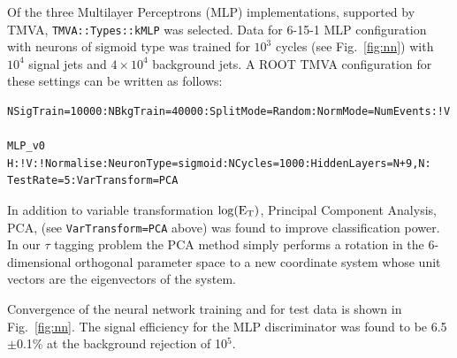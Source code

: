 \documentclass[a4paper]{jpconf}
\begin{document}




Of the three Multilayer Perceptrons (MLP) implementations, 
supported by TMVA,
{\tt TMVA::Types::kMLP} was selected.
Data for 6-15-1 MLP configuration with neurons of sigmoid type 
was trained for $10^3$ cycles (see Fig.~\ref{fig:nn}) with
$10^4$ signal jets and $4\times 10^4$ background jets. 
A ROOT TMVA configuration for these settings can be written as follows:
 
\begin{verbatim}
NSigTrain=10000:NBkgTrain=40000:SplitMode=Random:NormMode=NumEvents:!V

MLP_v0  H:!V:!Normalise:NeuronType=sigmoid:NCycles=1000:HiddenLayers=N+9,N:
TestRate=5:VarTransform=PCA
\end{verbatim}

In addition to variable transformation $\log({\rm E}_{\rm T})$, 
Principal Component Analysis, PCA, 
(see {\tt  VarTransform=PCA} above) was found to improve classification power.
In our $\tau$ tagging problem the PCA method simply performs a rotation 
in the 6-dimensional orthogonal parameter space to a new coordinate system whose unit vectors
are the eigenvectors of the system. 

Convergence of the neural network training and 
for test data is shown in Fig.~\ref{fig:nn}.
The signal efficiency for the MLP discriminator was found to be 6.5$\pm$0.1\% at 
the background rejection of 10$^5$.
\end{document}
